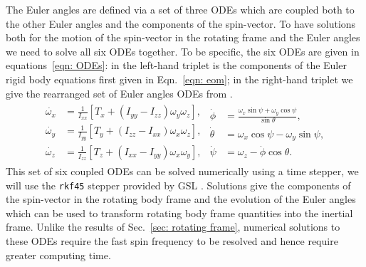 \documentclass[../full_thesis/full_thesis.tex]{subfiles}
\begin{document}
The Euler angles are defined via a set of three ODEs which are coupled both to
the other Euler angles and the components of the spin-vector. To have solutions
both for the motion of the spin-vector in the rotating frame and the Euler
angles we need to solve all six ODEs together. To be specific, the six ODEs are
given in equations~\eqref{eqn: ODEs}: in the left-hand triplet is the
components of the Euler rigid body equations first given in Eqn.~\eqref{eqn:
eom}; in the right-hand triplet we give the rearranged set of Euler angles ODEs
from \citet{Landau1969}.
\begin{align}
\begin{split}
\dot{\omega_{x}} & = \frac{1}{I_{xx}}\left[T_{x} +
                      \left(I_{yy} - I_{zz}\right) \omega_{y} \omega_{z}\right],
\\
\dot{\omega_{y}} & = \frac{1}{I_{yy}}\left[T_{y} +
                      \left(I_{zz} - I_{xx}\right) \omega_{x} \omega_{z}\right],
\\
\dot{\omega_{z}} & =\frac{1}{I_{zz}}\left[T_{z} +
                      \left(I_{xx} - I_{yy}\right) \omega_{x} \omega_{y}\right],
\end{split}
\begin{split}
\dot{\phi} & = \frac{\omega_{x} \sin \psi + \omega_{y} \cos \psi}{\sin \theta},\\
\dot{\theta} & = \omega_{x} \cos \psi - \omega_{y} \sin \psi,\\
\dot{\psi} & = \omega_{z} - \dot{\phi} \cos \theta.
\end{split}
\label{eqn: ODEs}
\end{align}
This set of six coupled ODEs can be solved numerically using a time stepper, we
will use the \texttt{rkf45} stepper provided by GSL \citep{gough2009gnu}.
Solutions give the components of the spin-vector in the rotating body frame and the
evolution of the Euler angles which can be used to transform rotating body frame
quantities into the inertial frame. Unlike the results of Sec.~\ref{sec:
rotating frame}, numerical solutions to these ODEs require the fast spin frequency
to be resolved and hence require greater computing time.

\end{document}
